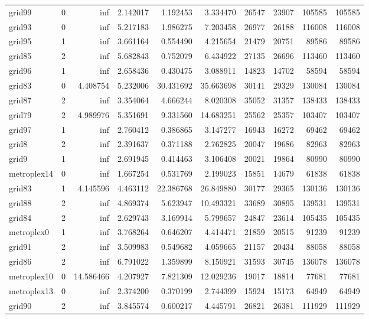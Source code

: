 \begin{longtable}{|l|r|r|r|r|r|r|r|r|r|}
grid99 & 0 & inf & 2.142017 & 1.192453 & 3.334470 & 26547 & 23907 & 105585 & 105585 \\
grid93 & 0 & inf & 5.217183 & 1.986275 & 7.203458 & 26977 & 26188 & 116008 & 116008 \\
grid95 & 1 & inf & 3.661164 & 0.554490 & 4.215654 & 21479 & 20751 & 89586 & 89586 \\
grid85 & 2 & inf & 5.682843 & 0.752079 & 6.434922 & 27135 & 26696 & 113460 & 113460 \\
grid96 & 1 & inf & 2.658436 & 0.430475 & 3.088911 & 14823 & 14702 & 58594 & 58594 \\
grid83 & 0 & 4.408754 & 5.232006 & 30.431692 & 35.663698 & 30141 & 29329 & 130084 & 130084 \\
grid87 & 2 & inf & 3.354064 & 4.666244 & 8.020308 & 35052 & 31357 & 138433 & 138433 \\
grid79 & 2 & 4.989976 & 5.351691 & 9.331560 & 14.683251 & 25562 & 25357 & 103407 & 103407 \\
grid97 & 1 & inf & 2.760412 & 0.386865 & 3.147277 & 16943 & 16272 & 69462 & 69462 \\
grid8 & 2 & inf & 2.391637 & 0.371188 & 2.762825 & 20047 & 19686 & 82963 & 82963 \\
grid9 & 1 & inf & 2.691945 & 0.414463 & 3.106408 & 20021 & 19864 & 80990 & 80990 \\
metroplex14 & 0 & inf & 1.667254 & 0.531769 & 2.199023 & 15851 & 14679 & 61838 & 61838 \\
grid83 & 1 & 4.145596 & 4.463112 & 22.386768 & 26.849880 & 30177 & 29365 & 130136 & 130136 \\
grid88 & 2 & inf & 4.869374 & 5.623947 & 10.493321 & 33689 & 30895 & 139531 & 139531 \\
grid84 & 2 & inf & 2.629743 & 3.169914 & 5.799657 & 24847 & 23614 & 105435 & 105435 \\
metroplex0 & 1 & inf & 3.768264 & 0.646207 & 4.414471 & 21859 & 20515 & 91239 & 91239 \\
grid91 & 2 & inf & 3.509983 & 0.549682 & 4.059665 & 21157 & 20434 & 88058 & 88058 \\
grid86 & 2 & inf & 6.791022 & 1.359899 & 8.150921 & 31593 & 30745 & 136078 & 136078 \\
metroplex10 & 0 & 14.586466 & 4.207927 & 7.821309 & 12.029236 & 19017 & 18814 & 77681 & 77681 \\
metroplex13 & 0 & inf & 2.374200 & 0.370199 & 2.744399 & 15924 & 15173 & 64949 & 64949 \\
grid90 & 2 & inf & 3.845574 & 0.600217 & 4.445791 & 26821 & 26381 & 111929 & 111929 \\

\end{longtable}
